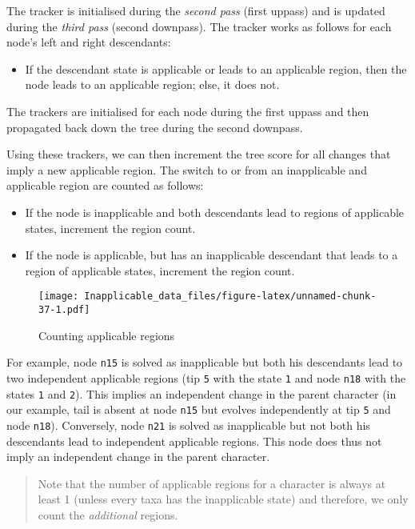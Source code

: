 \documentclass[]{book}
\providecommand{\tightlist}{%
  \setlength{\itemsep}{0pt}\setlength{\parskip}{0pt}}
\theoremstyle{definition}
\theoremstyle{definition}
\theoremstyle{definition}
\theoremstyle{remark}
\begin{document}
The tracker is initialised during the \emph{second pass} (first uppass)
and is updated during the \emph{third pass} (second downpass). The
tracker works as follows for each node's left and right descendants:

\begin{itemize}
\tightlist
\item
  If the descendant state is applicable or leads to an applicable
  region, then the node leads to an applicable region; else, it does
  not.
\end{itemize}

The trackers are initialised for each node during the first uppass and
then propagated back down the tree during the second downpass.

Using these trackers, we can then increment the tree score for all
changes that imply a new applicable region. The switch to or from an
inapplicable and applicable region are counted as follows:

\begin{itemize}
\tightlist
\item
  If the node is inapplicable and both descendants lead to regions of
  applicable states, increment the region count.
\item
  If the node is applicable, but has an inapplicable descendant that
  leads to a region of applicable states, increment the region count.
\end{itemize}

\begin{figure}
\centering
\texttt{[image: Inapplicable\_data\_files/figure-latex/unnamed-chunk-37-1.pdf]}
\caption{\label{fig:unnamed-chunk-37}Counting applicable regions}
\end{figure}

For example, node \texttt{n15} is solved as inapplicable but both his
descendants lead to two independent applicable regions (tip \texttt{5}
with the state \texttt{1} and node \texttt{n18} with the states
\texttt{1} and \texttt{2}). This implies an independent change in the
parent character (in our example, tail is absent at node \texttt{n15}
but evolves independently at tip \texttt{5} and node \texttt{n18}).
Conversely, node \texttt{n21} is solved as inapplicable but not both his
descendants lead to independent applicable regions. This node does thus
not imply an independent change in the parent character.

\begin{quote}
Note that the number of applicable regions for a character is always at
least 1 (unless every taxa has the inapplicable state) and therefore, we
only count the \emph{additional} regions.
\end{quote}
\end{document}
